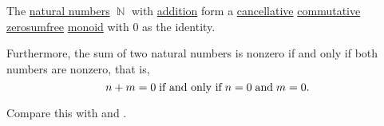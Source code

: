 \begin{proposition}\label{thm:natural_number_addition_properties}
  The \hyperref[def:set_of_natural_numbers]{natural numbers} \( \BbbN \) with \hyperref[def:peano_arithmetic/plus]{addition} form a \hyperref[def:magma/cancellative]{cancellative} \hyperref[def:magma/commutative]{commutative} \hyperref[def:zerosumfree]{zerosumfree} \hyperref[def:monoid]{monoid} with \( 0 \) as the identity.

  Furthermore, the sum of two natural numbers is nonzero if and only if both numbers are nonzero, that is,
  \begin{equation}\label{eq:thm:natural_number_addition_properties/nonzero_sum}
    n + m = 0 \T{if and only if} n = 0 \T{and} m = 0.
  \end{equation}

  Compare this with  and .
\end{proposition}
